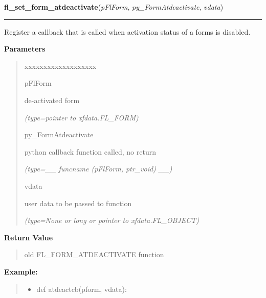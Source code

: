 \hspace{.8\funcindent}\begin{boxedminipage}{\funcwidth}

    \raggedright \textbf{fl\_set\_form\_atdeactivate}(\textit{pFlForm}, \textit{py\_FormAtdeactivate}, \textit{vdata})

    \vspace{-1.5ex}

    \rule{\textwidth}{0.5\fboxrule}
\setlength{\parskip}{2ex}
    Register a callback that is called when activation status of a forms is
    disabled.

\setlength{\parskip}{1ex}
      \textbf{Parameters}
      \vspace{-1ex}

      \begin{quote}
        \begin{Ventry}{xxxxxxxxxxxxxxxxxxx}

          \item[pFlForm]

          de-activated form

            {\it (type=pointer to xfdata.FL\_FORM)}

          \item[py\_FormAtdeactivate]

          python callback function called, no return

            {\it (type=\_\_ funcname (pFlForm, ptr\_void) \_\_)}

          \item[vdata]

          user data to be passed to function

            {\it (type=None or long or pointer to xfdata.FL\_OBJECT)}

        \end{Ventry}

      \end{quote}

      \textbf{Return Value}
    \vspace{-1ex}

      \begin{quote}
      old FL\_FORM\_ATDEACTIVATE function

      \end{quote}

\textbf{Example:}
\begin{quote}
  \begin{itemize}

  \item
    \setlength{\parskip}{0.6ex}
def atdeactcb(pform, vdata):




\end{itemize}
\end{quote}
\end{boxedminipage}

